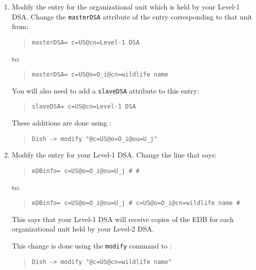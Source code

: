 \begin{enumerate}
\item	Modify the entry for the organizational unit which is held by your
Level-1 DSA.
Change the \verb"masterDSA" attribute of the entry corresponding to that
unit from:
\begin{quote}\small\begin{verbatim}
masterDSA= c=US@cn=Level-1 DSA
\end{verbatim}\end{quote}
to:
\begin{quote}\small\begin{verbatim}
masterDSA= c=US@o=O_i@cn=wildlife name
\end{verbatim}\end{quote}
You will also need to add a \verb"slaveDSA" attribute to this entry:
\begin{quote}\small\begin{verbatim}
slaveDSA= c=US@cn=Level-1 DSA
\end{verbatim}\end{quote}

These additions are done using :
\begin{quote}\small\begin{verbatim}
Dish -> modify "@c=US@o=O_i@ou=U_j"
\end{verbatim}\end{quote}

\item	Modify the entry for your Level-1 DSA.
Change the line that says:
\begin{quote}\small\begin{verbatim}
eDBinfo= c=US@o=O_i@ou=U_j # #
\end{verbatim}\end{quote}
to:
\begin{quote}\small\begin{verbatim}
eDBinfo= c=US@o=O_i@ou=U_j # c=US@o=O_i@cn=wildlife name #
\end{verbatim}\end{quote}
This says that your Level-1 DSA will receive copies of the EDB for each
organizational unit held by your Level-2 DSA.

This change is done using the \verb"modify" command to :
\begin{quote}\small\begin{verbatim}
Dish -> modify "@c=US@cn=wildlife name"
\end{verbatim}\end{quote}


\end{enumerate}
